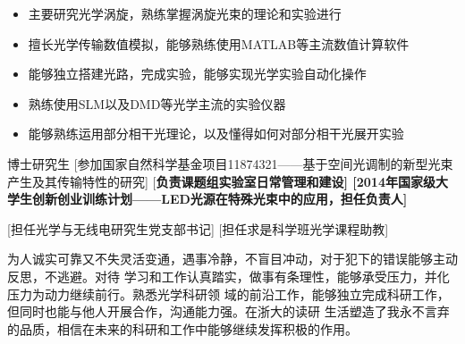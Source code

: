 \documentclass[zh]{resume}
\begin{document}
\begin{itemize}
  \item 主要研究光学涡旋，熟练掌握涡旋光束的理论和实验进行
  \item 擅长光学传输数值模拟，能够熟练使用MATLAB等主流数值计算软件
  \item 能够独立搭建光路，完成实验，能够实现光学实验自动化操作
  \item 熟练使用SLM以及DMD等光学主流的实验仪器
  \item 能够熟练运用部分相干光理论，以及懂得如何对部分相干光展开实验
\end{itemize}


\begin{experiences}
    {博士研究生}%
    [参加国家自然科学基金项目11874321——基于空间光调制的新型光束产生及其传输特性的研究] 
  [\bf{负责课题组实验室日常管理和建设}]
  [2014年国家级大学生创新创业训练计划——LED光源在特殊光束中的应用，担任负责人]
\end{experiences}
\begin{experiences}
  [担任光学与无线电研究生党支部书记]
  [担任求是科学班光学课程助教]
\end{experiences}

\begin{competences}
\end{competences}

为人诚实可靠又不失灵活变通，遇事冷静，不盲目冲动，对于犯下的错误能够主动反思，不逃避。对待
学习和工作认真踏实，做事有条理性，能够承受压力，并化压力为动力继续前行。熟悉光学科研领
域的前沿工作，能够独立完成科研工作，但同时也能与他人开展合作，沟通能力强。在浙大的读研
生活塑造了我永不言弃的品质，相信在未来的科研和工作中能够继续发挥积极的作用。
\end{document}
